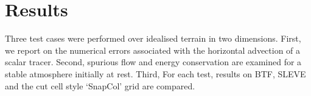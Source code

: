 \chapter{Results}
Three test cases were performed over idealised terrain in two dimensions.  First, we report on the numerical errors associated with the horizontal advection of a scalar tracer.  Second, spurious flow and energy conservation are examined for a stable atmosphere initially at rest.  Third,   For each test, results on BTF, SLEVE and the cut cell style `SnapCol' grid are compared.  






